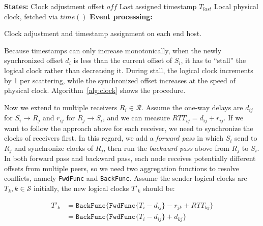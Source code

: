 \begin{algorithm}[t]
 \DontPrintSemicolon
 \textbf{States:} Clock adjustment offset $off$\;
 \qquad Last assigned timestamp $T_{last}$\;
 \qquad Local physical clock, fetched via $time()$\;
 \textbf{Event processing:}\;
 \caption{Clock adjustment and timestamp assignment on each end host.}
 \label{alg:clock}
\end{algorithm}



Because timestamps can only increase monotonically, when the newly synchronized offset $d_i$ is less than the current offset of $S_i$, it has to ``stall'' the logical clock rather than decreasing it. During stall, the logical clock increments by 1 per scattering, while the synchronized offset increases at the speed of physical clock. Algorithm~\ref{alg:clock} shows the procedure.

Now we extend to multiple receivers $R_i \in \mathcal{R}$.
Assume the one-way delays are $d_{ij}$ for $S_i \rightarrow R_j$ and $r_{ij}$ for $R_j \rightarrow S_i$, and we can measure $RTT_{ij} = d_{ij} + r_{ij}$. If we want to follow the approach above for each receiver, we need to synchronize the clocks of receivers first. In this regard, we add a \textit{forward pass} in which $S_i$ send to $R_j$ and synchronize clocks of $R_j$, then run the \textit{backward pass} above from $R_j$ to $S_i$. In both forward pass and backward pass, each node receives potentially different offsets from multiple peers, so we need two aggregation functions to resolve conflicts, namely \texttt{FwdFunc} and \texttt{BackFunc}. Assume the sender logical clocks are $T_k, k \in \mathcal{S}$ initially, the new logical clocks $T'_k$ should be:

\vspace{-1em}
\begin{equation*}
\begin{aligned}
T'_k & = \texttt{BackFunc} \{ \texttt{FwdFunc} \{ T_i - d_{ij} \} - r_{jk} + RTT_{kj} \} \\
     & = \texttt{BackFunc} \{ \texttt{FwdFunc} \{ T_i - d_{ij} \} + d_{kj} \}
\end{aligned}
\end{equation*}

